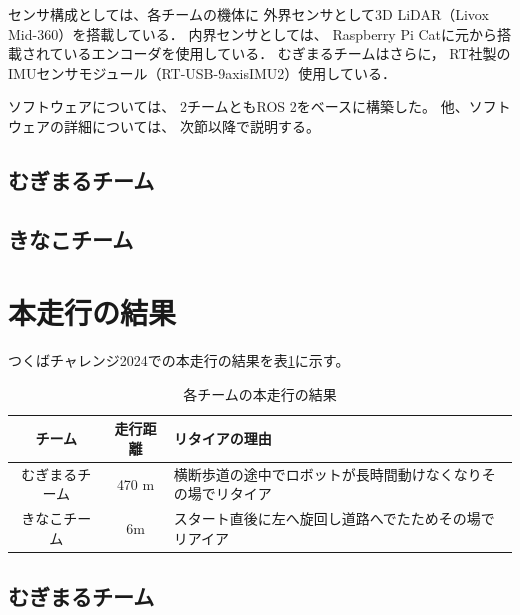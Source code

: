 \documentclass[twocolumn,9pt]{jsproceedings}
\begin{document}
センサ構成としては、各チームの機体に
外界センサとして3D LiDAR（Livox Mid-360）を搭載している．
内界センサとしては、
Raspberry Pi Catに元から搭載されているエンコーダを使用している．
むぎまるチームはさらに，
RT社製のIMUセンサモジュール（RT-USB-9axisIMU2）使用している．

ソフトウェアについては、
2チームともROS 2をベースに構築した。
他、ソフトウェアの詳細については、
次節以降で説明する。


\subsection{むぎまるチーム}


\subsection{きなこチーム}\label{sub:localization}




\section{本走行の結果}

つくばチャレンジ2024での本走行の結果を表\ref{MainRun}に示す。

\begin{table}[H]
  \caption{各チームの本走行の結果}
  \label{MainRun}
  \begin{tabular}{|c|c|p{4.0cm}|}
    \hline
    チーム         & 走行距離 & リタイアの理由                                                                                             \\
    \hline
    むぎまるチーム & 470 m    & 横断歩道の途中でロボットが長時間動けなくなりその場でリタイア\\
    \hline
    きなこチーム　 & 6m    & スタート直後に左へ旋回し道路へでたためその場でリアイア \\
    \hline
  \end{tabular}
\end{table}



\subsection{むぎまるチーム}

\end{document}
